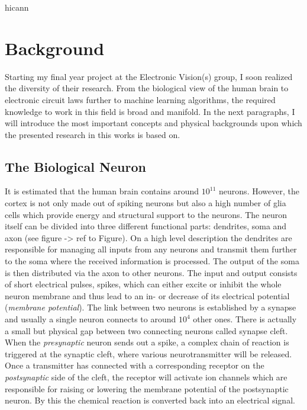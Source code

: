 \gls{hicann}\chapter{Background}
Starting my final year project at the Electronic Vision(s) group, I soon realized the diversity of their research. From the biological view of the human brain to electronic circuit laws further to machine learning algorithms, the required knowledge to work in this field is broad and manifold. In the next paragraphs, I will introduce the most important concepts and physical backgrounds upon which the presented research in this works is based on.

\section{The Biological Neuron}

It is estimated that the human brain contains around $10^11$ neurons. However, the cortex is not only made out of spiking neurons but also a high number of glia cells which provide energy and structural support to the neurons. The neuron itself can be divided into three different functional parts: dendrites, soma and axon (see figure -> ref to Figure). On a high level description the dendrites are responsible for managing all inputs from any neurons and transmit them further to the soma where the received information is processed. The output of the soma is then distributed via the axon to other neurons.  The input and output consists of short electrical pulses, spikes, which can either excite or inhibit the whole neuron membrane and thus lead to an in- or decrease of its electrical potential (\textit{membrane potential}). The link between two neurons is established by a synapse and usually a single neuron connects to around $10^4$ other ones. There is actually a small but physical gap between two connecting neurons called synapse cleft. When the \textit{presynaptic} neuron sends out a spike, a complex chain of reaction is triggered at the synaptic cleft, where various neurotransmitter will be released. Once a transmitter has connected with a corresponding receptor on the \textit{postsynaptic} side of the cleft, the receptor will activate ion channels which are responsible for raising or lowering the membrane potential of the postsynaptic neuron. By this the chemical reaction is converted back into an electrical signal.\\

